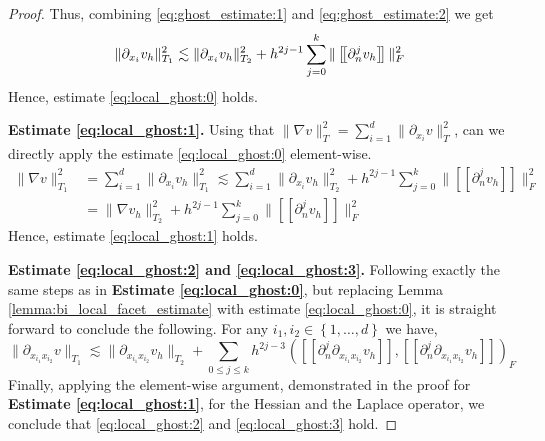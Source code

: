\documentclass[11pt]{article}
\theoremstyle{remark}
\newcommand{\jump}[1]{\left[\!\left[ #1 \right]\!\right]}
\renewcommand{\le}{\leqslant}
\numberwithin{equation}{section}
\begin{document}
\begin{proof}
Thus, combining \eqref{eq:ghost_estimate:1} and \eqref{eq:ghost_estimate:2} we get
\begin{equation}
    \| \partial _{x_{i}} v_{h} \|_{  T_{1}}^{2  }  \lesssim \| \partial _{x_{i}} v_{h} \|_{ T_{2} }^{  2} + h^{2j-1}\sum_{j=0}^{k} \| \jump{ \partial _{n}^{j} v_{h} }   \|_{F  }^{2  } \\
\end{equation}
        Hence, estimate \eqref{eq:local_ghost:0} holds.

        \textbf{Estimate \eqref{eq:local_ghost:1}.} Using that $\| \nabla  v \|_{T_{}  }^{ 2 } =  \sum_{i=1}^{d} \|  \partial _{x_{i}} v  \|_{T_{}  }^{ 2 }$, can we directly apply the estimate \eqref{eq:local_ghost:0} element-wise.
        \begin{equation}
            \begin{split}
\| \nabla v \|_{T_{1}  }^{2  } &= \sum_{i=1}^{d} \| \partial _{x_{i}}  v_{h} \|_{ T_{1} }^{  2}  \lesssim  \sum_{i=1}^{d} \| \partial _{x_{i}}  v_{h} \|_{ T_{2} }^{  2} + h^{2j-1}\sum_{j=0}^{k} \| \jump{ \partial _{n}^{j} v_{h} }   \|_{F  }^{2  }  \\
         &  = \| \nabla  v_{h} \|_{ T_{2} }^{  2} + h^{2j-1}\sum_{j=0}^{k} \| \jump{ \partial _{n}^{j} v_{h} }   \|_{F  }^{2  }
            \end{split}
        \end{equation}
        Hence, estimate \eqref{eq:local_ghost:1} holds.


\textbf{Estimate \eqref{eq:local_ghost:2} and \eqref{eq:local_ghost:3}.}
Following exactly the same steps as in \textbf{Estimate \eqref{eq:local_ghost:0}}, but replacing Lemma \ref{lemma:bi_local_facet_estimate} with estimate \eqref{eq:local_ghost:0}, it is straight forward to conclude the following. For any  $i_{1},i_{2} \in
\left\{ 1,\ldots, d \right\}$ we have,
\begin{equation}
    \| \partial _{x_{i_1} x_{i_2}} v \|_{ T_{1} }^{  }  \lesssim \| \partial_{ x_{i_1} x_{i_2} } v_{h} \|_{ T_{2} }^{  } + \sum_{0\le j\le k}  {h^{2j -3}}^{} \left(  \jump{ \partial _{n}^{j} \partial _{x_{i_1} x_{i_2}} v_{h} }, \jump{ \partial ^{j}_{n}
        \partial _{x_{i_1} x_{i_2}} v_{h} } \right)     _{F}
\end{equation}
Finally, applying the element-wise argument, demonstrated in the proof for \textbf{Estimate \eqref{eq:local_ghost:1}}, for the Hessian and the Laplace operator, we conclude that \eqref{eq:local_ghost:2} and \eqref{eq:local_ghost:3} hold.

\end{proof}
\end{document}
